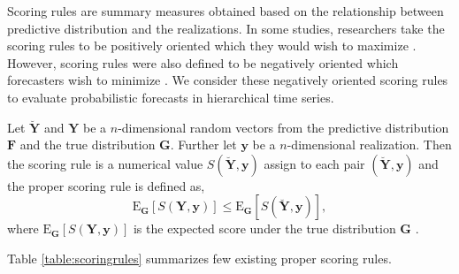 \documentclass[a4paper, 11pt]{article}
\def\E{\text{E}}
\begin{document}
Scoring rules are summary measures obtained based on the relationship between predictive distribution and the realizations. In some studies, researchers take the scoring rules to be positively oriented which they would wish to maximize \citep{Gneiting2007}. However, scoring rules were also defined to be negatively oriented which forecasters wish to minimize \citep{Gneiting2014}. We consider these negatively oriented scoring rules to evaluate probabilistic forecasts in hierarchical time series.

Let $\breve{\bm{Y}}$ and $\bm{Y}$ be a $n$-dimensional random vectors from the predictive distribution $\bm{F}$ and the true distribution $\bm{G}$. Further let $\bm{y}$ be a $n$-dimensional realization. Then the scoring rule is a numerical value $S(\breve{\bm{Y}},\bm{y})$ assign to each pair $(\breve{\bm{Y}},\bm{y})$ and the proper scoring rule is defined as,
\begin{equation}\label{eq:(3.1.)}
\E_{\bm{G}}[S(\bm{Y},\bm{y})] \le \E_{\bm{G}}[S(\breve{\bm{Y}},\bm{y})],
\end{equation}
where $\E_{\bm{G}}[S(\bm{Y,y})]$ is the expected score under the true distribution $\bm{G}$ \citep{Gneiting2008, Gneiting2014}.

Table \ref{table:scoringrules} summarizes few existing proper scoring rules.
\end{document}
